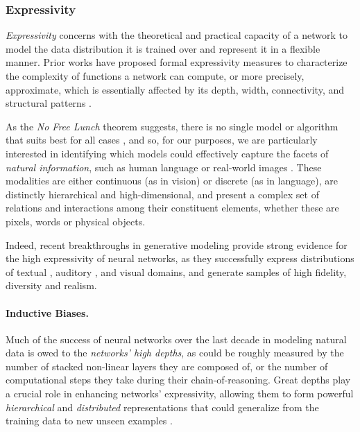 \subsubsection{Expressivity} 
\label{sec:modeling-expressivity} 

\textit{Expressivity} concerns with the theoretical and practical capacity of a network to model the data distribution it is trained over and represent it in a flexible manner. Prior works have proposed formal expressivity measures to characterize the complexity of functions a network can compute, or more precisely, approximate, which is essentially affected by its depth, width, connectivity, and structural patterns \citep{expressive}.

As the \textit{No Free Lunch} theorem suggests, there is no single model or algorithm that suits best for all cases \citep{lunch}, and so, for our purposes, we are particularly interested in identifying which models could effectively capture the facets of \textit{natural information}, such as human language or real-world images \citep{bengiobook}. These modalities are either continuous (as in vision) or discrete (as in language),  are distinctly hierarchical and high-dimensional, and present a complex set of relations and interactions among their constituent elements, whether these are  pixels, words or physical objects. 

Indeed, recent breakthroughs in generative modeling provide strong evidence for the high expressivity of neural networks, as they successfully express distributions of textual \citep{brown2020gpt3,devlin2019bert,jurassic1,gpt-j}, auditory \citep{Oord2016WaveNetAG}, and visual \citep{stylegan2,biggan} domains, and generate samples of high fidelity, diversity and realism.

\paragraph{Inductive Biases.} Much of the success of neural networks over the last decade in modeling natural data is owed to the \textit{networks' high depths}, as could be roughly measured by the number of stacked non-linear layers they are composed of, or the number of computational steps they take during their chain-of-reasoning.  Great depths play a crucial role in enhancing networks' expressivity, allowing them to form powerful \textit{hierarchical} and \textit{distributed} representations that could generalize from the training data to new unseen examples \citep{he2016resnet,levine2020limits}. 

